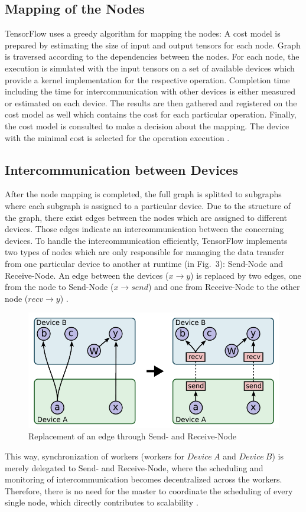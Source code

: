 \documentclass[ieeetran]{article}
\begin{document}
\subsection{Mapping of the Nodes} %
\label{sub:mapping_of_nodes} 
TensorFlow uses a greedy algorithm for mapping the nodes: A cost model is prepared by estimating the size of input and output tensors for each node. Graph is traversed according to the dependencies between the nodes. For each node, the execution is simulated with the input tensors on a set of available devices which provide a kernel implementation for the respective operation. Completion time including the time for intercommunication with other devices is either measured or estimated on each device. The results are then gathered and registered on the cost model as well which contains the cost for each particular operation. Finally, the cost model is consulted to make a decision about the mapping. The device with the minimal cost is selected for the operation execution \cite{first}.

\subsection{Intercommunication between Devices} %
\label{sub:intercommunication_between_devices}
After the node mapping is completed, the full graph is splitted to subgraphs where each subgraph is assigned to a particular device. Due to the structure of the graph, there exist edges between the nodes which are assigned to different devices. Those edges indicate an intercommunication between the concerning devices. To handle the intercommunication efficiently, TensorFlow implements two types of nodes which are only responsible for managing the data transfer from one particular device to another at runtime (in Fig.\ 3): Send-Node and Receive-Node. An edge between the devices ($x \rightarrow y$) is replaced by two edges, one from the node to Send-Node ($x \rightarrow send$) and one from Receive-Node to the other node ($recv \rightarrow y$) \cite{first}.

\begin{figure}[h!]
  \centering
  \includegraphics[width=0.5\linewidth]{intercommunication}
  \caption{Replacement of an edge through Send- and Receive-Node}
  \label{fig:intercommunication}
\end{figure}
\hspace{-0.52cm}This way, synchronization of workers (workers for $Device \ A$ and $Device\ B$) is merely delegated to Send- and Receive-Node, where the scheduling and monitoring of intercommunication becomes decentralized across the workers. Therefore, there is no need for the master to coordinate the scheduling of every single node, which directly contributes to scalability \cite{first}.
\end{document}

